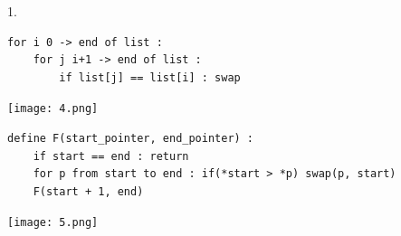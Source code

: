 \documentclass[12pt,a4paper]{article}
\begin{document}
1. 
\begin{lstlisting}[mathescape]
for i 0 -> end of list :
	for j i+1 -> end of list :
		if list[j] == list[i] : swap 
\end{lstlisting}

\texttt{[image: 4.png]}

\begin{lstlisting}[mathescape]
define F(start_pointer, end_pointer) :
	if start == end : return
	for p from start to end : if(*start > *p) swap(p, start)
	F(start + 1, end)
\end{lstlisting}

\texttt{[image: 5.png]}
\end{document}

